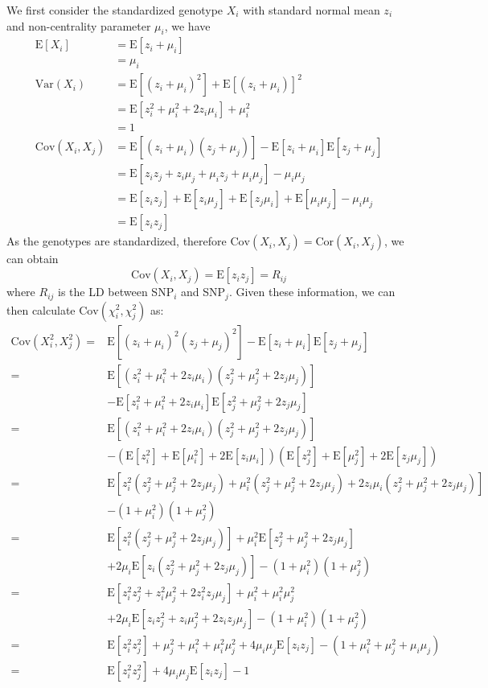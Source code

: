 			We first consider the standardized genotype $X_i$ with standard normal mean $z_i$ and non-centrality parameter
			$\mu_i$, we have
			\begin{align*}
				\mathrm{E}[X_i]&=\mathrm{E}[z_i+\mu_i]\\
				&=\mu_i\\
				\mathrm{Var}(X_i) &=\mathrm{E}[(z_i+\mu_i)^2]+\mathrm{E}[(z_i+\mu_i)]^2\\
				&=\mathrm{E}[z_i^2+\mu_i^2+2z_i\mu_i]+\mu_i^2\\
				&=1 \\
				\mathrm{Cov}(X_i,X_j)&=\mathrm{E}[(z_i+\mu_i)(z_j+\mu_j)]-\mathrm{E}[z_i+\mu_i]\mathrm{E}[z_j+\mu_j]\\
				&=\mathrm{E}[z_iz_j+z_i\mu_j+\mu_iz_j+\mu_i\mu_j]-\mu_i\mu_j\\
				&=\mathrm{E}[z_iz_j]+\mathrm{E}[z_i\mu_j]+\mathrm{E}[z_j\mu_i]+\mathrm{E}[\mu_i\mu_j]-\mu_i\mu_j\\
				&=\mathrm{E}[z_iz_j]
			\end{align*}
			As the genotypes are standardized, therefore $\mathrm{Cov}(X_i,X_j)=\mathrm{Cor}(X_i,X_j)$, we can obtain
			$$
				\mathrm{Cov}(X_i,X_j)=\mathrm{E}[z_iz_j]=R_{ij}
			$$
			where $R_{ij}$ is the \gls{LD} between \gls{SNP}$_i$ and \gls{SNP}$_j$.
			Given these information, we can then calculate $\mathrm{Cov}(\chi_i^2,\chi_j^2)$ as:
			\begin{align*}
				\mathrm{Cov}(X_i^2,X_j^2)=&\mathrm{E}[(z_i+\mu_i)^2(z_j+\mu_j)^2]-\mathrm{E}[z_i+\mu_i]\mathrm{E}[z_j+\mu_j]\\
				=&\mathrm{E}[(z_i^2+\mu_i^2+2z_i\mu_i)(z_j^2+\mu_j^2+2z_j\mu_j)] \\
				&-\mathrm{E}[z_i^2+\mu_i^2+2z_i\mu_i]\mathrm{E}[z_j^2+\mu_j^2+2z_j\mu_j]\\
				=&\mathrm{E}[(z_i^2+\mu_i^2+2z_i\mu_i)(z_j^2+\mu_j^2+2z_j\mu_j)]\\
				&-(\mathrm{E}[z_i^2]+\mathrm{E}[\mu_i^2]+2\mathrm{E}[z_i\mu_i])(\mathrm{E}[z_j^2]+\mathrm{E}[\mu_j^2]+2\mathrm{E}[z_j\mu_j])\\
				=&\mathrm{E}[z_i^2(z_j^2+\mu_j^2+2z_j\mu_j)+\mu_i^2(z_j^2+\mu_j^2+2z_j\mu_j)+2z_i\mu_i(z_j^2+\mu_j^2+2z_j\mu_j)]\\
				&-(1+\mu_i^2)(1+\mu_j^2)\\
				=&\mathrm{E}[z_i^2(z_j^2+\mu_j^2+2z_j\mu_j)]+\mu_i^2\mathrm{E}[z_j^2+\mu_j^2+2z_j\mu_j]\\
				&+2\mu_i\mathrm{E}[z_i(z_j^2+\mu_j^2+2z_j\mu_j)]-(1+\mu_i^2)(1+\mu_j^2)\\
				=&\mathrm{E}[z_i^2z_j^2+z_i^2\mu_j^2+2z_i^2z_j\mu_j]+\mu_i^2+\mu_i^2\mu_j^2\\
				&+2\mu_i\mathrm{E}[z_iz_j^2+z_i\mu_j^2+2z_iz_j\mu_j]-(1+\mu_i^2)(1+\mu_j^2)\\
				=&\mathrm{E}[z_i^2z_j^2]+\mu_j^2+\mu_i^2+\mu_i^2\mu_j^2+4\mu_i\mu_j\mathrm{E}[z_iz_j]-(1+\mu_i^2+\mu_j^2+\mu_i\mu_j)\\
				=&\mathrm{E}[z_i^2z_j^2]+4\mu_i\mu_j\mathrm{E}[z_iz_j]-1
			\end{align*}
